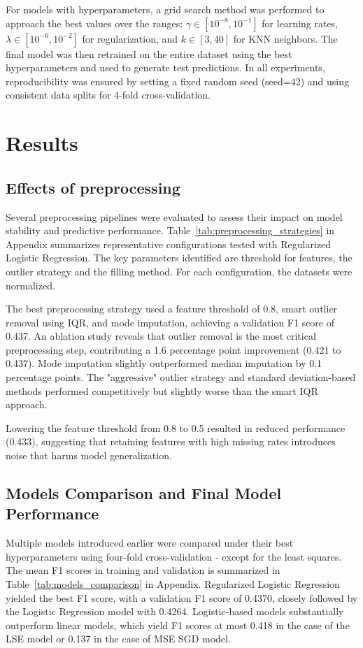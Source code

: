 \documentclass[10pt,conference,compsocconf]{IEEEtran}
\begin{document}
For models with hyperparameters, a grid search method was performed to approach the best values over the ranges: $\gamma \in [10^{-8}, 10^{-1}]$ for learning rates, $\lambda \in [10^{-6}, 10^{-2}]$ for regularization, and $k \in [3, 40]$ for KNN neighbors. The final model was then retrained on the entire dataset using the best hyperparameters and used to generate test predictions. In all experiments, reproducibility was ensured by setting a fixed random seed (seed=42) and using consistent data splits for 4-fold cross-validation.

\section{Results}
\label{sec:results}

\subsection{Effects of preprocessing}
Several preprocessing pipelines were evaluated to assess their impact on model stability and predictive performance. Table~\ref{tab:preprocessing_strategies} in Appendix summarizes representative configurations tested with Regularized Logistic Regression. The key parameters identified are threshold for features, the outlier strategy and the filling method. For each configuration, the datasets were normalized.

The best preprocessing strategy used a feature threshold of 0.8, smart outlier removal using IQR, and mode imputation, achieving a validation F1 score of 0.437. An ablation study reveals that outlier removal is the most critical preprocessing step, contributing a 1.6 percentage point improvement (0.421 to 0.437). Mode imputation slightly outperformed median imputation by 0.1 percentage points. The "aggressive" outlier strategy and standard deviation-based methods performed competitively but slightly worse than the smart IQR approach.

Lowering the feature threshold from 0.8 to 0.5 resulted in reduced performance (0.433), suggesting that retaining features with high missing rates introduces noise that harms model generalization.


\subsection{Models Comparison and Final Model Performance}
Multiple models introduced earlier were compared under their best hyperparameters using four-fold cross-validation - except for the least squares. The mean F1 scores in training and validation is  summarized in Table~\ref{tab:models_comparison} in Appendix. Regularized Logistic Regression yielded the best F1 score, with a validation F1 score of 0.4370, closely followed by the Logistic Regression model with 0.4264. Logistic-based models substantially outperform linear models, which yield F1 scores at most 0.418 in the case of the LSE model or 0.137 in the case of MSE SGD model. 
\end{document}
